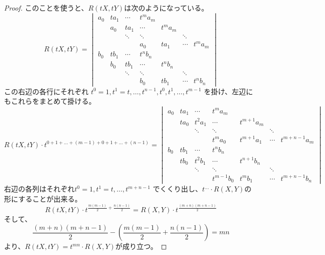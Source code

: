 \documentclass[a4]{article}
\begin{document}
\begin{proof}
            このことを使うと、$R(tX,tY)$は次のようになっている。
            \[
            R(tX,tY)=
            \begin{vmatrix}
                a_0&    ta_1&   \cdots&     t^m a_m \\
                {}&     a_0&    t a_1&      \cdots&     t^m a_m \\
                {}&     {}&     \ddots&     \ddots&     {}&     \ddots& \\
                {}&     {}&     {}&         a_0&        t a_1&  \cdots&    t^m a_m \\
                b_0&    t b_1&  \cdots&     t^n b_n \\
                {}&     b_0&    t b_1&      \cdots&     t^n b_n \\
                {}&     {}&     \ddots&     \ddots&     {}&     \ddots& \\
                {}&     {}&     {}&         b_0&        t b_1&  \cdots&    t^n b_n
            \end{vmatrix}
            \]
            この右辺の各行にそれぞれ
            $t^{0}=1, t^{1}=t, \dots, t^{n-1}, t^0, t^1, \dots, t^{m-1}$
            を掛け、左辺にもこれらをまとめて掛ける。
            \[
            R(tX,tY)\cdot t^{0+1+\dots+(m-1)+0+1+\dots+(n-1)}=
            \begin{vmatrix}
                a_0&    t a_1&  \cdots&     t^m a_m \\
                {}&     t a_0&  t^2 a_1&    \cdots&         t^{m+1} a_m \\
                {}&     {}&     \ddots&     \ddots&         {}&             \ddots& \\
                {}&     {}&     {}&         t^m a_0&        t^{m+1} a_1&    \cdots&    t^{m+n-1} a_m \\
                b_0&    t b_1&  \cdots&     t^n b_n \\
                {}&     t b_0&  t^2 b_1&    \cdots&         t^{n+1} b_n \\
                {}&     {}&     \ddots&     \ddots&         {}&             \ddots& \\
                {}&     {}&     {}&         t^{m-1} b_0&    t^m b_1&        \cdots&    t^{m+n-1} b_n
            \end{vmatrix}
            \]
            右辺の各列はそれぞれ$t^{0}=1, t^{1}=t, \dots, t^{m+n-1}$
            でくくり出し、$t^{\dots} \cdot R(X,Y)$の形にすることが出来る。
            \[
                R(tX,tY) \cdot t^{\frac{m(m-1)}{2}+\frac{n(n-1)}{2}}=R(X,Y) \cdot t^{\frac{(m+n)(m+n-1)}{2}}
            \]
            そして、
            \[
                \frac{(m+n)(m+n-1)}{2}-\left( \frac{m(m-1)}{2}+\frac{n(n-1)}{2} \right)=mn
            \]
            より、$R(tX,tY)=t^{mn} \cdot R(X,Y)$が成り立つ。

            
        \end{proof}
\end{document}
